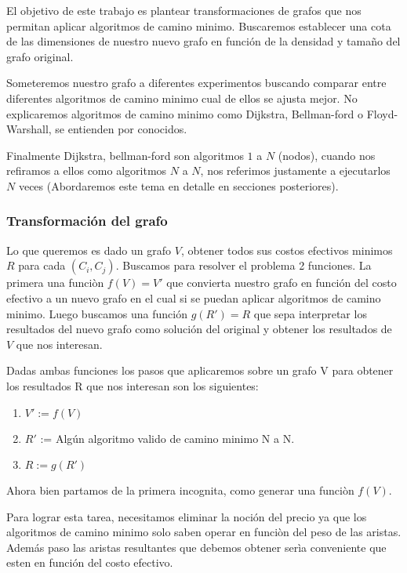 \documentclass[12pt]{article}
\begin{document}
El objetivo de este trabajo es plantear transformaciones de grafos que nos permitan aplicar algoritmos de camino minimo. Buscaremos establecer una cota de las dimensiones de nuestro nuevo grafo en función de la densidad y tamaño del grafo original.

Someteremos nuestro grafo a diferentes experimentos buscando comparar entre diferentes algoritmos de camino minimo cual de ellos se ajusta mejor. No explicaremos algoritmos de camino minimo como Dijkstra, Bellman-ford o Floyd-Warshall, se entienden por conocidos.

Finalmente Dijkstra, bellman-ford son algoritmos $1$ a $N$ (nodos), cuando nos refiramos a ellos como algoritmos $N$ a $N$, nos referimos justamente a ejecutarlos $N$ veces (Abordaremos este tema en detalle en secciones posteriores).

\subsubsection{Transformación del grafo}

Lo que queremos es dado un grafo $V$, obtener todos sus costos efectivos minimos $R$ para cada $(C_i, C_j)$. Buscamos para resolver el problema 2 funciones. La primera una funciòn $f(V) = V'$ que convierta nuestro grafo en función del costo efectivo a un nuevo grafo en el cual si se puedan aplicar algoritmos de camino minimo. Luego buscamos una función $g(R') = R$ que sepa interpretar los resultados del nuevo grafo como solución del original y obtener los resultados de $V$ que nos interesan.

Dadas ambas funciones los pasos que aplicaremos sobre un grafo V para obtener los resultados R que nos interesan son los siguientes:

\begin{enumerate}
	\item $V' := f(V)$
	\item $R'$ := Algún algoritmo valido de camino minimo N a N.
	\item $R := g(R')$
\end{enumerate}

Ahora bien partamos de la primera incognita, como generar una funciòn $f(V)$.

Para lograr esta tarea, necesitamos eliminar la noción del precio ya que los algoritmos de camino minimo solo saben operar en funciòn del peso de las aristas. Además paso las aristas resultantes que debemos obtener serìa conveniente que esten en función del costo efectivo.
\end{document}
